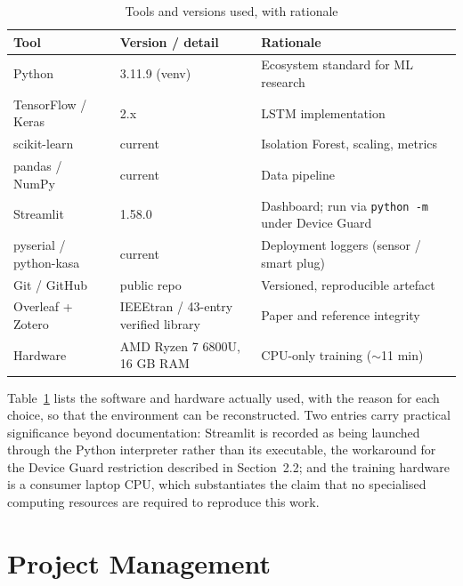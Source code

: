 \documentclass[11pt,a4paper]{article}
\begin{document}
\begin{table}[htbp]
\centering
\caption{Tools and versions used, with rationale}
\label{tab:tools}
\small
\renewcommand{\arraystretch}{1.3}
\begin{tabular}{|l|l|p{5.6cm}|}
\hline
\textbf{Tool} & \textbf{Version / detail} & \textbf{Rationale}\\ \hline
Python & 3.11.9 (venv) & Ecosystem standard for ML research\\ \hline
TensorFlow / Keras & 2.x & LSTM implementation \cite{abadi2016tensorflow}\\ \hline
scikit-learn & current & Isolation Forest, scaling, metrics\\ \hline
pandas / NumPy & current & Data pipeline\\ \hline
Streamlit & 1.58.0 & Dashboard; run via \texttt{python -m} under Device Guard\\ \hline
pyserial / python-kasa & current & Deployment loggers (sensor / smart plug)\\ \hline
Git / GitHub & public repo & Versioned, reproducible artefact\\ \hline
Overleaf + Zotero & IEEEtran / 43-entry verified library & Paper and reference integrity\\ \hline
Hardware & AMD Ryzen 7 6800U, 16 GB RAM & CPU-only training ($\sim$11 min)\\ \hline
\end{tabular}
\end{table}

Table~\ref{tab:tools} lists the software and hardware actually used, with the reason for each choice, so that the environment can be reconstructed. Two entries carry practical significance beyond documentation: Streamlit is recorded as being launched through the Python interpreter rather than its executable, the workaround for the Device Guard restriction described in Section~2.2; and the training hardware is a consumer laptop CPU, which substantiates the claim that no specialised computing resources are required to reproduce this work.



\section{Project Management}
\end{document}
